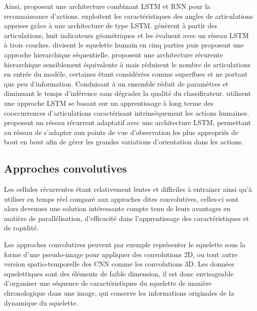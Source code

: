 Ainsi, \cite{baccouche2011sequential} proposent une architecture combinant LSTM et RNN pour la reconnaissance d'actions.
 \cite{avola2018exploiting} exploitent les caractéristiques des angles de articulations apprises grâce à une architecture de type LSTM. 
\cite{zhang2017geometric} génèrent à partir des articulations, huit indicateurs géométriques et les évaluent avec un réseau LSTM à trois couches.
\cite{du2015hierarchical} divisent le squelette humain en cinq parties puis proposent une approche hierarchique séquentielle.
\cite{shukla2017recurrent} proposent une architecture récurente hierarchique sensiblement équivalente à \cite{du2015hierarchical} mais réduisent le nombre de articulations en entrée du modèle, certaines étant considérées comme superflues et ne portant que peu d'information. Conduisant à un ensemble réduit de paramètres et diminuant le temps d'inférence sans dégrader la qualité du classificateur.
\cite{shahroudy2016ntu} utilisent une approche LSTM se basant sur un apprentissage à long terme des cooccurrences d'articulations caractérisant intrinsèquement les actions humaines.
\cite{zhang2017view} proposent un réseau récurrent adaptatif avec une architecture LSTM, permettant au réseau de s'adapter aux points de vue d'observation les plus appropriés de bout en bout afin de gérer les grandes variations d'orientation dans les actions.

\subsection{Approches convolutives}
Les cellules récurrentes étant relativement lentes et difficiles à entrainer ainsi qu'à utiliser en temps réel comparé aux approches dites convolutives, celles-ci sont alors devenues une solution intéressante compte tenu de leurs avantages en matière de parallélisation, d'efficacité dans l'apprentissage des caractéristiques et de rapidité.


Les approches convolutives peuvent par exemple représenter le squelette sous la forme d'une pseudo-image pour appliquer des convolutions 2D, ou tout autre version spatio-temporelle des CNN comme les convolutions 3D. Les données squelettiques sont des éléments de faible dimension, il est donc envisageable d'organiser une séquence de caractéristiques du squelette de manière chronologique dans une image, qui conserve les informations originales de la dynamique du squelette.


